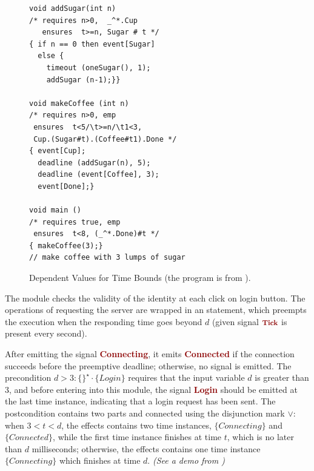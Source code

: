 \documentclass[acmsmall,10pt,review]{acmart}
\newcommand{\anyevent}[1]{{\textcolor{darkred}
{{\textbf{\footnotesize #1}}}}}
\newcommand{\code}[1]{{\tt{\ensuremath{\m{#1}}}}}
\newcommand{\m}{\mathit}
\begin{document}
\begin{figure}[ht]
      \vspace{0mm}
\begin{lstlisting}[columns=fullflexible]
void addSugar(int n)
/* requires n>0,  _^*.Cup 
   ensures  t>=n, Sugar # t */
{ if n == 0 then event[Sugar] 
  else {
    timeout (oneSugar(), 1);
    addSugar (n-1);}}
  
void makeCoffee (int n)
/* requires n>0, emp 
 ensures  t<5/\t>=n/\t1<3, 
 Cup.(Sugar#t).(Coffee#t1).Done */
{ event[Cup];
  deadline (addSugar(n), 5);
  deadline (event[Coffee], 3);
  event[Done];}
  
void main () 
/* requires true, emp 
 ensures  t<8, (_^*.Done)#t */
{ makeCoffee(3);}
// make coffee with 3 lumps of sugar

\end{lstlisting}  
      \vspace{0mm}
      \caption{Dependent Values for Time Bounds (the program is from  \cite{berry2020hiphop}).}\label{fig:overview_eg1}
         \vspace{0mm}
\end{figure}


The {} module checks the validity of the identity at each click on login button. The operations of requesting the server are wrapped in an {\textbf{\color{purple}}} statement, which preempts the execution when the responding time goes beyond \code{\m{d}} (given signal \code{\anyevent{Tick}} is present every second).


After emitting the signal \anyevent{Connecting}, it emits  \anyevent{Connected} if the connection succeeds before the  preemptive deadline; otherwise, no signal is emitted. 
The precondition \code{d{>}3 : \{
\}^\star \cdot\{\m{Login}\} } requires that the input variable \code{d} is greater than 3, and before entering into this module, the signal \anyevent{Login} should be emitted at the last time instance, indicating that a login request has been sent. 
The postcondition contains two parts and connected using the disjunction mark \code{{\vee}}: when \code{3{<}t{<}d}, the effects contains two time instances, \code{\{\m{Connecting}\}} and \code{\{\m{Connected}\}}, while the first  time instance finishes at time \code{t}, %
which is no later than \code{\m{d}} milliseconds; otherwise, the effects contains one time instance \code{\{Connecting\}} which finishes at time \code{d}. \emph{(See a demo from \cite{CODE1})}
\end{document}
